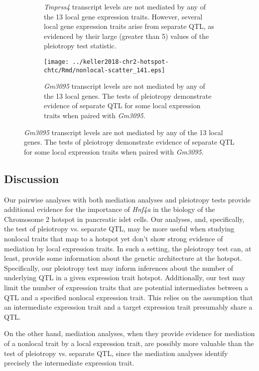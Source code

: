 \documentclass[oneside]{book}
\begin{document}
\begin{figure}
\begin{subfigure}[t]{.45\textwidth}
        \caption[\emph{Tmprss4} transcript levels are not mediated by any of the 13 local gene expression traits.]{\emph{Tmprss4} transcript levels are not mediated by any of the 13 local gene expression traits. However, several local gene expression traits arise from separate QTL, as evidenced by their large (greater than 5) values of the pleiotropy test statistic.}
    \end{subfigure}\hspace{0.05\textwidth}
    \begin{subfigure}[t]{.45\textwidth}
        \texttt{[image: ../keller2018-chr2-hotspot-chtc/Rmd/nonlocal-scatter\_141.eps]}
        \caption[\emph{Gm3095} transcript levels are not mediated by any of the 13 local genes.]{\emph{Gm3095} transcript levels are not mediated by any of the 13 local genes. The tests of pleiotropy demonstrate evidence of separate QTL for some local expression traits when paired with \emph{Gm3095}.}
    \end{subfigure}
    \label{fig:4nonlocal}
\end{figure}





\subsection{Discussion}

Our pairwise analyses with both mediation analyses and pleiotropy tests provide additional evidence for the importance of \emph{Hnf4a} in the biology of the Chromosome 2 hotspot in pancreatic islet cells. Our analyses, and, specifically, the test of pleiotropy vs. separate QTL, may be more useful when studying nonlocal traits that map to a hotspot yet don't show strong evidence of mediation by local expression traits. In such a setting, the pleiotropy test can, at least, provide some information about the genetic architecture at the hotspot. Specifically, our pleiotropy test may inform inferences about the number of underlying QTL in a given expression trait hotspot. Additionally, our test may limit the number of expression traits that are potential intermediates between a QTL and a specified nonlocal expression trait. This relies on the assumption that an intermediate expression trait and a target expression trait presumably share a QTL.

On the other hand, mediation analyses, when they provide evidence for mediation of a nonlocal trait by a local expression trait, are possibly more valuable than the test of pleiotropy vs. separate QTL, since the mediation analyses identify precisely the intermediate expression trait.
\end{document}
